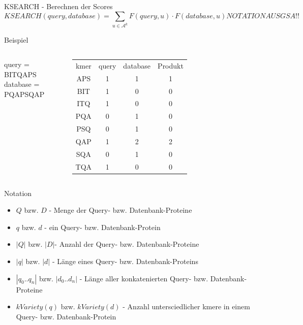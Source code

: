 \documentclass[xcolor=dvipsnames, aspectratio=1610]{beamer}
\begin{document}
\begin{frame}{KSEARCH - Berechnen der Scores}
  \begin{equation*}
    KSEARCH(query,database) = \sum_{u \in \mathcal A^k} F(query,u) \cdot F(database,u) NOTATION AUS GSA!!
  \end{equation*}  
  \begin{block}{Beispiel}
    \begin{columns}
    query = BITQAPS\\
    database = PQAPSQAP\\  
    \scriptsize\begin{tabular}{cccc}
    kmer & query & database & Produkt\\
    APS & 1 & 1 & 1\\
    BIT & 1 & 0 & 0\\
    ITQ & 1 & 0 & 0 \\
    PQA & 0 & 1 & 0\\
    PSQ & 0 & 1 & 0\\
    QAP & 1 & 2 & 2\\
    SQA & 0 & 1 & 0\\
    TQA & 1 & 0 & 0\\    
    \end{tabular}
    \normalsize
    \end{columns}
  \end{block}
\end{frame}

\begin{frame}{Notation}
  \begin{itemize}
    \item $Q$ bzw. $D$ - Menge der Query- bzw. Datenbank-Proteine
    \item $q$ bzw. $d$ - ein Query- bzw. Datenbank-Protein
    \item $|Q|$ bzw. $|D|$- Anzahl der Query- bzw. Datenbank-Proteine
    \item $|q|$ bzw. $|d|$ - Länge eines Query- bzw. Datenbank-Proteins
    \item $|q_0..q_n|$ bzw. $|d_0..d_n|$ - Länge aller konkatenierten Query- bzw. Datenbank-Proteine
    \item $kVariety(q)$ bzw. $kVariety(d)$ - Anzahl untersciedlicher kmere in einem Query- bzw. Datenbank-Protein
  \end{itemize}
\end{frame}
\end{document}
